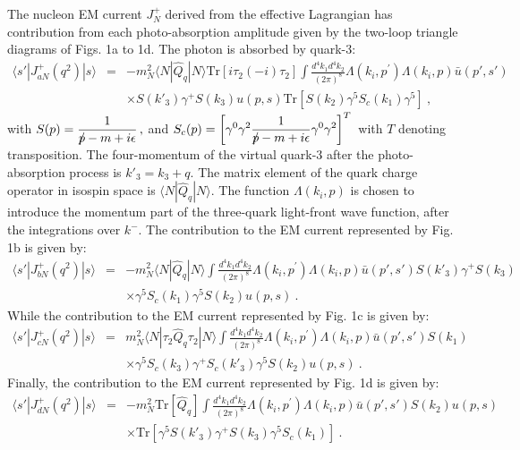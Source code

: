 \documentclass[preprint,aps,showpacs,floatfix]{revtex4}
\begin{document}
\begin{appendix}
The nucleon EM current $J^+_{N}$ derived from the
effective Lagrangian has contribution from each photo-absorption
amplitude given by the two-loop triangle diagrams of
Figs. 1a to 1d. The photon is absorbed by quark-3:
\begin{eqnarray} 
\langle s'|J^+_{aN}(q^2)|s\rangle 
&=& -m_N^2\langle N|\hat Q_q| N\rangle {\mathrm{Tr}}[i \tau_2(-i )\tau_2] \int
\frac{d^4k_1d^4k_2}{(2\pi)^8}\Lambda(k_i,p^{\prime})\Lambda(k_i,p)
\bar u(p',s')
\nonumber\\
& & \times S(k'_3)\gamma^+ S(k_3)u(p,s) {\mathrm{Tr}}\left[S(k_2)
\gamma^5 S_c(k_1)\gamma^5\right] \ ,  
\label{j+a}
\end{eqnarray}
with $\displaystyle S(p)=\frac{1}{\rlap\slash p-m+i  \epsilon} \,
,$ and $\displaystyle S_c(p)=\left[\gamma^0\gamma^2
\frac{1}{\rlap\slash p-m+i  \epsilon}\gamma^0\gamma^2\right]^T
\, $ with $T$ denoting transposition. 
The four-momentum of the virtual quark-3 after the
photo-absorption process is $k'_3=k_3+q  $. The matrix element of
the quark charge operator in isospin space is $\langle N|\hat Q_q|
N\rangle$. The function $\displaystyle \Lambda(k_i,p)$ is chosen
to introduce the momentum part of the three-quark light-front wave
function, after the integrations over $k^-$. The
contribution to the EM current represented by Fig. 
1b is given by:
\begin{eqnarray}
\langle s'|J^+_{b N}(q^2)|s\rangle 
&=& - m_N^2\langle N|\hat Q_q|
N\rangle \int \frac{d^4k_1d^4k_2}{(2\pi)^8}\Lambda(k_i,p^{\prime})
\Lambda(k_i,p) \bar u(p',s')S(k'_3)\gamma^+S(k_3)
\nonumber \\
& &\times \gamma^5 S_c(k_1)\gamma^5 S(k_2)u(p,s)
\ .  \label{j+b}
\end{eqnarray}
While the contribution to the EM current represented by
Fig. 1c is given by:
\begin{eqnarray}
\langle s'|J^+_{c N}(q^2)|s\rangle 
&=& m_N^2\langle N|\tau_2\hat
Q_q\tau_2| N\rangle \int
\frac{d^4k_1d^4k_2}{(2\pi)^8}\Lambda(k_i,p^{\prime})
\Lambda(k_i,p) \bar u(p',s')S(k_1)
\nonumber \\
& &\times \gamma^5 S_c(k_3)\gamma^+ S_c(k'_3)\gamma^5 S(k_2)u(p,s) \ .  \label{j+c}
\end{eqnarray}
Finally, the contribution to the EM current  represented by
Fig. 1d is given by:
\begin{eqnarray}
\langle s'|J^+_{d N}(q^2)|s\rangle 
&=& -m_N^2 {\mathrm{Tr}} [\hat
Q_q]\int \frac{d^4k_1d^4k_2}{(2\pi)^8}\Lambda(k_i,p^{\prime})
\Lambda(k_i,p)\bar u(p',s')S(k_2)u(p,s)
\nonumber\\
& &\times {\mathrm{Tr}}\left[ \gamma^5 S(k'_3)\gamma^+
S(k_3)\gamma^5 S_c(k_1)\right] \ .  \label{j+d}
\end{eqnarray}


\end{appendix}
\end{document}
